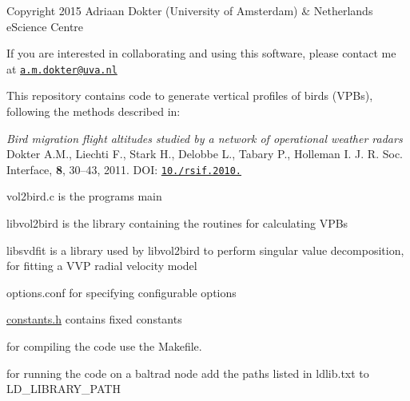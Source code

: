 Copyright 2015 Adriaan Dokter (University of Amsterdam) \& Netherlands e\+Science Centre

If you are interested in collaborating and using this software, please contact me at \href{mailto:a.m.dokter@uva.nl}{\tt a.\+m.\+dokter@uva.\+nl}

This repository contains code to generate vertical profiles of birds (V\+P\+Bs), following the methods described in\+:

{\itshape Bird migration flight altitudes studied by a network of operational weather radars} Dokter A.\+M., Liechti F., Stark H., Delobbe L., Tabary P., Holleman I. J. R. Soc. Interface, {\bfseries 8}, 30–43, 2011. D\+OI\+: \href{https://doi.org/10.1098/rsif.2010.0116}{\tt 10./rsif.2010.}


\begin{DoxyEnumerate}
\item {\ttfamily vol2bird.\+c} is the program\textquotesingle{}s main
\item {\ttfamily libvol2bird} is the library containing the routines for calculating V\+P\+Bs
\item {\ttfamily libsvdfit} is a library used by libvol2bird to perform singular value decomposition, for fitting a V\+VP radial velocity model
\item {\ttfamily options.\+conf} for specifying configurable options
\item {\ttfamily \mbox{\hyperlink{constants_8h_source}{constants.\+h}}} contains fixed constants
\end{DoxyEnumerate}

for compiling the code use the {\ttfamily Makefile}.

for running the code on a baltrad node add the paths listed in {\ttfamily ldlib.\+txt} to {\ttfamily L\+D\+\_\+\+L\+I\+B\+R\+A\+R\+Y\+\_\+\+P\+A\+TH} 